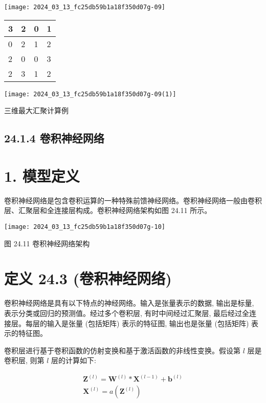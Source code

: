 \documentclass[10pt]{article}
\begin{document}
\begin{center}
\texttt{[image: 2024\_03\_13\_fc25db59b1a18f350d07g-09]}
\end{center}

\begin{center}
\begin{tabular}{|l|l|l|l|}
\hline
3 & 2 & 0 & 1 \\
\hline
0 & 2 & 1 & 2 \\
\hline
2 & 0 & 0 & 3 \\
\hline
2 & 3 & 1 & 2 \\
\hline
\end{tabular}
\end{center}

\begin{center}
\texttt{[image: 2024\_03\_13\_fc25db59b1a18f350d07g-09(1)]}
\end{center}

三维最大汇聚计算例

\subsection*{24.1.4 卷积神经网络}
\section*{1. 模型定义}
卷积神经网络是包含卷积运算的一种特殊前馈神经网络。卷积神经网络一般由卷积层、汇聚层和全连接层构成。卷积神经网络架构如图 24.11 所示。

\begin{center}
\texttt{[image: 2024\_03\_13\_fc25db59b1a18f350d07g-10]}
\end{center}

图 24.11 卷积神经网络架构

\section*{定义 24.3 (卷积神经网络)}
卷积神经网络是具有以下特点的神经网络。输入是张量表示的数据, 输出是标量, 表示分类或回归的预测值。经过多个卷积层, 有时中间经过汇聚层, 最后经过全连接层。每层的输入是张量 (包括矩阵) 表示的特征图, 输出也是张量 (包括矩阵) 表示的特征图。

卷积层进行基于卷积函数的仿射变换和基于激活函数的非线性变换。假设第 $l$ 层是卷积层, 则第 $l$ 层的计算如下:


\begin{gather*}
\boldsymbol{Z}^{(l)}=\boldsymbol{W}^{(l)} * \boldsymbol{X}^{(l-1)}+\boldsymbol{b}^{(l)}  \tag{24.10}\\
\boldsymbol{X}^{(l)}=a\left(\boldsymbol{Z}^{(l)}\right) \tag{24.11}
\end{gather*}
\end{document}
